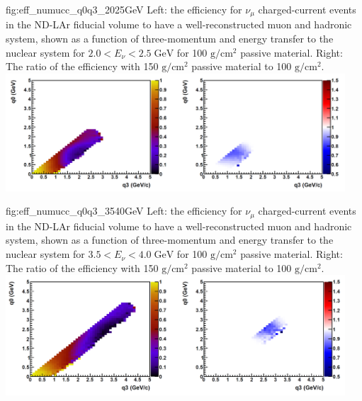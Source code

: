 \begin{dunefigure}[Muon reconstruction efficiency vs. q0,q3,Enu=2.0-2.5 GeV]{fig:eff_numucc_q0q3_2025GeV}
{Left: the efficiency for $\nu_\mu$ charged-current events in the ND-LAr fiducial volume to have a well-reconstructed muon and hadronic system, shown as a function of three-momentum and energy transfer to the nuclear system for $2.0 < E_\nu < 2.5\;\mbox{GeV}$ for 100 $\mbox{g}/\mbox{cm}^2$ passive material. Right: The ratio of the efficiency with 150 $\mbox{g}/\mbox{cm}^2$ passive material to 100 $\mbox{g}/\mbox{cm}^2$.}
\includegraphics[width=0.95\textwidth]{graphics/cryostat/numu_cc_efficiency_q0q3_2.0-2.5GeV.png}
\end{dunefigure}

\begin{dunefigure}[Muon reconstruction efficiency vs. q0,q3, Enu=3.5-4.0 GeV]{fig:eff_numucc_q0q3_3540GeV}
{Left: the efficiency for $\nu_\mu$ charged-current events in the ND-LAr fiducial volume to have a well-reconstructed muon and hadronic system, shown as a function of three-momentum and energy transfer to the nuclear system for $3.5 < E_\nu < 4.0\;\mbox{GeV}$ for 100 $\mbox{g}/\mbox{cm}^2$ passive material. Right: The ratio of the efficiency with 150 $\mbox{g}/\mbox{cm}^2$ passive material to 100 $\mbox{g}/\mbox{cm}^2$.}
\includegraphics[width=0.95\textwidth]{graphics/cryostat/numu_cc_efficiency_q0q3_3.5-4.0GeV.png}
\end{dunefigure}

